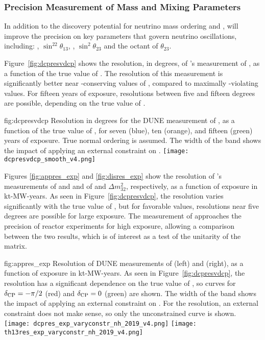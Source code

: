 \subsubsection{Precision Measurement of Mass and Mixing Parameters}

In addition to the discovery potential for neutrino mass ordering and , 
 will improve the precision on key parameters that govern neutrino oscillations, including: \deltacp, $\sin^22\theta_{13}$, , $\sin^2\theta_{23}$ and the octant of $\theta_{23}$. 

Figure~\ref{fig:dcpresvdcp} shows the resolution, in degrees, of 's measurement of \deltacp, as a function of the true value of \deltacp. The resolution of this measurement is significantly better near -conserving values of \deltacp, compared to maximally -violating values. For fifteen years of exposure, resolutions between five and fifteen degrees are possible, depending on the true value of \deltacp. 

\begin{dunefigure}
{fig:dcpresvdcp}
{Resolution in degrees for the DUNE measurement of \deltacp, as a function of the true value of \deltacp, for seven (blue), ten (orange), and fifteen (green) years of exposure. True normal ordering is assumed. The width of the band shows the impact of applying an external constraint on .}
		\texttt{[image: dcpresvdcp\_smooth\_v4.png]}
\end{dunefigure}


Figures \ref{fig:appres_exp} and  \ref{fig:disres_exp} show the resolution of 's measurements of \deltacp and  and of  and $\Delta m^{2}_{32}$, respectively, as a function of exposure in kt-MW-years. As seen in Figure~\ref{fig:dcpresvdcp}, the \deltacp resolution varies significantly with the true value of \deltacp, but for favorable values, resolutions near five degrees are possible for large exposure. The  measurement of  approaches the precision of reactor experiments for high exposure, allowing a comparison between the two results, which is of interest as a test of the unitarity of the  matrix. 

\begin{dunefigure}
{fig:appres_exp}
{Resolution of DUNE measurements of \deltacp (left) and  (right), as a function of exposure in kt-MW-years. As seen in Figure~\ref{fig:dcpresvdcp}, the \deltacp resolution has a significant dependence on the true value of \deltacp, so curves for $\delta_{\rm CP}=-\pi/2$ (red) and $\delta_{\rm CP}=0$ (green) are shown. The width of the band shows the impact of applying an external constraint on . For the  resolution, an external constraint does not make sense, so only the unconstrained curve is shown.}
		\texttt{[image: dcpres\_exp\_varyconstr\_nh\_2019\_v4.png]} %
		\texttt{[image: th13res\_exp\_varyconstr\_nh\_2019\_v4.png]} 
\end{dunefigure}


